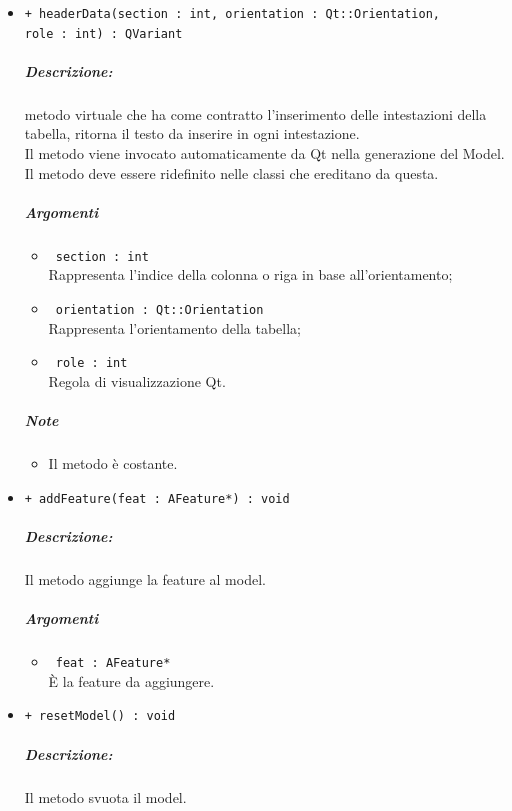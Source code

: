 {\begin{itemize}
	\item \color{blue}\verb!+ headerData(section : int, orientation : Qt::Orientation,!\\
	  \verb!role : int) : QVariant!\\
	\color{black}
	\subparagraph{Descrizione:} metodo virtuale che ha come contratto l'inserimento delle intestazioni della tabella, ritorna il testo da inserire in ogni intestazione.\\
	Il metodo viene invocato automaticamente da Qt\g{} nella generazione del Model.\\
	Il metodo deve essere ridefinito nelle classi che ereditano da questa.\\
	\subparagraph{Argomenti}
		\begin{itemize}
			\item \color{RoyalPurple}\verb! section : int!\\
			\color{black}Rappresenta l'indice della colonna o riga in base all'orientamento;
			
			\item \color{RoyalPurple}\verb! orientation : Qt::Orientation!\\
			\color{black}Rappresenta l'orientamento della tabella;
			
			\item \color{RoyalPurple}\verb! role : int!\\
			\color{black}Regola di visualizzazione Qt\g{}.
		\end{itemize}
	\subparagraph{Note}
			\begin{itemize}
				\item Il metodo è costante.
			\end{itemize}
		
	\item \color{blue}\verb!+ addFeature(feat : AFeature*) : void!\\
		\color{black}
		\subparagraph{Descrizione:} Il metodo aggiunge la feature\g{} al model.\\
		\subparagraph{Argomenti}
			\begin{itemize}				
				\item \color{RoyalPurple}\verb! feat : AFeature*!\\
				\color{black} È la feature\g{} da aggiungere.
			\end{itemize}
			
	\item \color{blue}\verb!+ resetModel() : void!\\
		\color{black}
		\subparagraph{Descrizione:} Il metodo svuota il model.\\
		

\end{itemize}}
